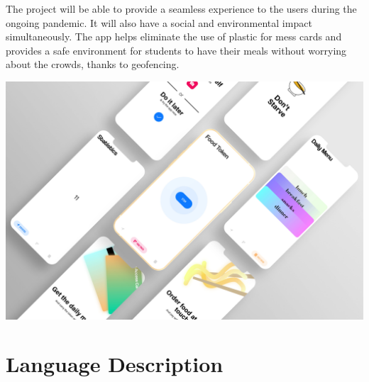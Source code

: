 \documentclass[12pt]{article}
\begin{document}
The project will be able to provide a seamless experience to the users during the ongoing pandemic. It will also have a social and environmental impact simultaneously. The app helps eliminate the use of plastic for mess cards and provides a safe environment for students to have their meals without worrying about the crowds, thanks to geofencing. \par 
\begin{center}
    \includegraphics[width=\linewidth]{highlight.jpg}
\end{center}
\newpage

\section*{\LARGE{Language Description}}
\end{document}
